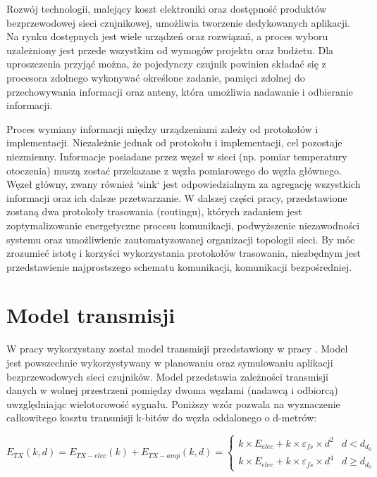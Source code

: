 \documentclass[a4paper,12pt,twoside,openany]{report}
\begin{document}
Rozwój technologii, malejący koszt elektroniki oraz dostępność produktów bezprzewodowej sieci czujnikowej, umożliwia tworzenie dedykowanych aplikacji.
Na rynku dostępnych jest wiele urządzeń oraz rozwiązań, a proces wyboru uzależniony jest przede wszystkim od wymogów projektu oraz budżetu.
Dla uproszczenia przyjąć można, że pojedynczy czujnik powinien składać się z procesora zdolnego wykonywać określone zadanie, pamięci zdolnej do przechowywania informacji
oraz anteny, która umożliwia nadawanie i odbieranie informacji.

Proces wymiany informacji między urządzeniami zależy od protokołów i implementacji.
Niezależnie jednak od protokołu i implementacji, cel pozostaje niezmienny. Informacje posiadane przez węzeł w sieci (np. pomiar temperatury otoczenia) muszą zostać przekazane z węzła pomiarowego 
do węzła głównego. Węzeł główny, zwany również `sink` jest odpowiedzialnym za agregację wszystkich informacji oraz ich dalsze przetwarzanie.  
W dalszej części pracy, przedstawione zostaną dwa protokoły trasowania (routingu), których zadaniem jest zoptymalizowanie energetyczne procesu komunikacji, podwyższenie niezawodności systemu 
oraz umożliwienie zautomatyzowanej organizacji topologii sieci.
By móc zrozumieć istotę i korzyści wykorzystania protokołów trasowania, niezbędnym jest przedstawienie najprostszego schematu komunikacji, komunikacji bezpośredniej.

\section{Model transmisji}

W pracy wykorzystany został model transmisji przedstawiony w pracy \cite{Heinzelman}.
Model jest powszechnie wykorzystywany w planowaniu oraz symulowaniu aplikacji bezprzewodowych sieci czujników.
Model przedstawia zależności transmisji danych w wolnej przestrzeni pomiędzy dwoma węzłami (nadawcą i odbiorcą) uwzględniając wielotorowość sygnału.
Poniższy wzór pozwala na wyznaczenie całkowitego kosztu transmisji k-bitów do węzła oddalonego o d-metrów:

\[
E_{TX}(k,d) = E_{TX-elec}(k) + E_{TX-amp}(k,d) = \begin{cases}
 k \times E_{elec} + k \times \varepsilon_{fs} \times d^2 & d < d_{d_{0}}\\
 k \times E_{elec} + k \times \varepsilon_{fs} \times d^4 & d \geq d_{d_{0}}
\end{cases}
\]
\end{document}
